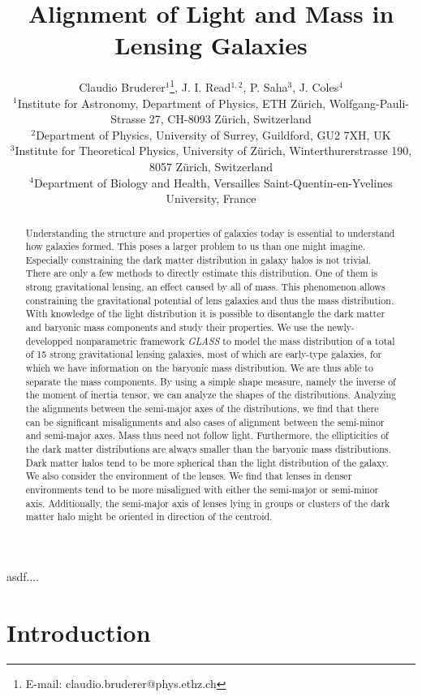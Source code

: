 \documentclass[useAMS,usenatbib]{mn2e}
\title[Alignment of Light and Mass in Lensing Galaxies]{Alignment of Light and Mass in Lensing Galaxies}
\author[Bruderer]{Claudio Bruderer$^{1}$\thanks{E-mail: claudio.bruderer@phys.ethz.ch}, J. I. Read$^{1,2}$, P. Saha$^{3}$, J. Coles$^{4}$\\
$^{1}$Institute for Astronomy, Department of Physics, ETH Z\"urich, Wolfgang-Pauli-Strasse 27, CH-8093 Z\"urich, Switzerland\\
$^{2}$Department of Physics, University of Surrey, Guildford, GU2 7XH, UK\\
$^{3}$Institute for Theoretical Physics, University of Z\"urich, Winterthurerstrasse 190, 8057 Z\"urich, Switzerland\\
$^{4}$Department of Biology and Health, Versailles Saint-Quentin-en-Yvelines University, France
}
\begin{document}
\maketitle

\begin{abstract}
Understanding the structure and properties of galaxies today is essential to understand how galaxies formed. This poses a larger problem to us than one might imagine. Especially constraining the dark matter distribution in galaxy halos is not trivial. There are only a few methods to directly estimate this distribution. One of them is strong gravitational lensing, an effect caused by all of mass. This phenomenon allows constraining the gravitational potential of lens galaxies and thus the mass distribution. With knowledge of the light distribution it is possible to disentangle the dark matter and baryonic mass components and study their properties.
We use the newly-developped nonparametric framework \textit{GLASS} to model the mass distribution of a total of 15 strong gravitational lensing galaxies, most of which are early-type galaxies, for which we have information on the baryonic mass distribution. We are thus able to separate the mass components. By using a simple shape measure, namely the inverse of the moment of inertia tensor, we can analyze the shapes of the distributions. Analyzing the alignments between the semi-major axes of the distributions, we find that there can be significant misalignments and also cases of alignment between the semi-minor and semi-major axes. Mass thus need not follow light. Furthermore, the ellipticities of the dark matter distributions are always smaller than the baryonic mass distributions. Dark matter halos tend to be more spherical than the light distribution of the galaxy. We also consider the environment of the lenses. We find that lenses in denser environments tend to be more misaligned with either the semi-major or semi-minor axis. Additionally, the semi-major axis of lenses lying in groups or clusters of the dark matter halo might be oriented in direction of the centroid.
\end{abstract}

\begin{keywords}
asdf....
\end{keywords}


\section{Introduction}\label{sec:introduction}
\end{document}
